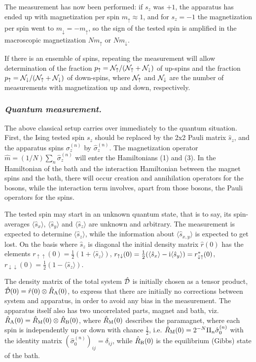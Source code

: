 \documentclass[12pt, onecolumn, aps,prb,floatfix]{revtex4-2}
\newcommand{\N}{{\cal N}}
\newcommand{\RA}{{\rm A}}
\newcommand{\RM}{{\rm M}}
\newcommand{\RB}{{\rm B}}
\newcommand{\down}{{\downarrow}}
\newcommand{\up}{{\uparrow}}
\newcommand{\uu}{{\uparrow\uparrow}}
\newcommand{\dd}{{\downarrow\downarrow}}
\newcommand{\ud}{{\uparrow\downarrow}}
\newcommand{\du}{{\downarrow\uparrow}}
\newcommand{\ri}{{\rm i}}
\newcommand{\half}{\frac{1}{2}}
\newcommand{\CD}{{\cal D}}
\begin{document}
The measurement has now been performed: if $s_z$ was $+1$, the apparatus has 
ended up with magnetization per spin $m_\up\approx 1$, and for $s_z=-1$ the 
magnetization per spin went to $m_\down=-m_\up$, so the sign of the tested spin 
is amplified in the macroscopic magnetization $Nm_\up$ or $Nm_\down$.

If there is an ensemble of spins, 
repeating the measurement will allow determination of the fraction
$p_\up=\N_\up/(\N_\up+\N_\down)$ of up-spins and the fraction
$p_\up=\N_\down/(\N_\up+\N_\down)$ of down-spins, where 
$\N_\up$ and $\N_\down$ are the number of measurements with magnetization
up and down, respectively.


\subsubsection*{\it Quantum measurement.} 

The above classical setup carries over immediately to the quantum 
situation. 
First, the Ising tested spin $s_z$ should be replaced by the 2x2 Pauli matrix 
$\hat s_z$, and the apparatus spins $\sigma_z^{(n)}$ by  $\hat \sigma_z^{(n)}$.
The magnetization operator $\hat m=(1/N)\sum_n \hat \sigma_z^{(n)}$ will
enter the Hamiltonians (1) and (3). In the Hamiltonian of the bath
and the interaction Hamiltonian between the magnet spins and the bath,
there will occur creation and annihilation operators for the bosons,
while the interaction term involves, apart from  those bosons,
the Pauli operators for the spins.

The tested spin may start in an unknown quantum state, that is to say, its
 spin-averages $\langle\hat s_x\rangle$, $\langle\hat s_y\rangle$ and 
$\langle\hat s_z\rangle$  are unknown and arbitrary. 
The measurement is expected to determine $\langle\hat s_z\rangle$, while the
information about  $\langle\hat s_{x,y}\rangle$ is expected to get lost. 
On the basis where $\hat s_z$ is diagonal 
the initial density matrix $\hat r(0)$ has the elements 
$r_{\uu}(0)=\half(1+\langle\hat s_z\rangle)$,   
$r_\ud(0)=\half(\langle\hat s_x\rangle-\ri\langle\hat 
s_y\rangle)=r_\du^\ast(0)$, $r_\dd(0)=\half(1-\langle\hat s_z\rangle)$.

The density matrix of the total system $\hat \CD$ is initially chosen as
a tensor product, $\hat\CD(0)=\hat r(0)\otimes \hat R_\RA(0)$,
 to express that there are initially no corrections between system and apparatus,
in order to avoid any bias in the measurement. 
The apparatus itself also has two uncorrelated parts, magnet and bath, viz.
$\hat R_\RA(0)=\hat R_\RM(0)\otimes \hat R_\RB(0)$, where 
$\hat R_\RM(0)$ describes the paramagnet, 
where each spin is independently up or down with chance $\half$, i.e.
 $\hat R_\RM(0)=2^{-N}\Pi_n \hat\sigma_0^{(n)}$ with 
the identity matrix $(\hat\sigma_0^{(n)})_{ij}=\delta_{ij}$,
while $\hat R_\RB(0)$ is the equilibrium (Gibbs) state of the bath.
\end{document}
